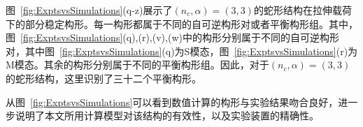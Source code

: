图~\ref{fig:ExptsvsSimulations}(q-z)展示了$(n_c,\alpha)=(3,3)$的蛇形结构在拉伸载荷下的部分稳定构形。每一构形都属于不同的自可逆构形对或者平衡构形组。其中，图~\ref{fig:ExptsvsSimulations}(q),(r),(v),(w)中的构形分别属于不同的自可逆构形对，其中图~\ref{fig:ExptsvsSimulations}(q)为S模态，图~\ref{fig:ExptsvsSimulations}(r)为M模态。其余的构形分别属于不同的平衡构形组。因此，对于$(n_c,\alpha)=(3,3)$的蛇形结构，这里识别了三十二个平衡构形。

从图~\ref{fig:ExptsvsSimulations}可以看到数值计算的构形与实验结果吻合良好，进一步说明了本文所用计算模型对该结构的有效性，以及实验装置的精确性。

%
%
%
